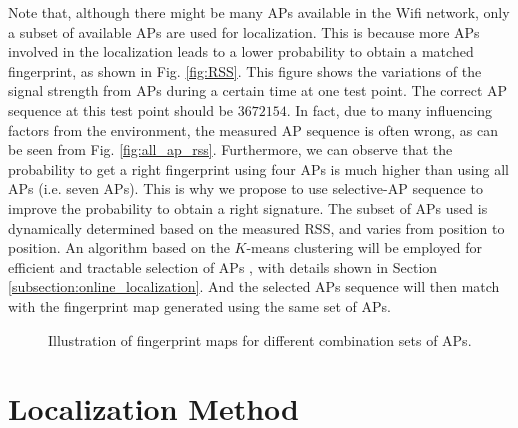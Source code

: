\documentclass[10pt, conference, letterpaper]{IEEEtran}
\begin{document}
Note that, although there might be many APs available in the Wifi network, only a subset of available APs are used for localization. 
This is because more APs involved in the localization leads to a lower probability to obtain a matched fingerprint, as shown in Fig. \ref{fig:RSS}. 
This figure shows the variations of the signal strength from APs during a certain time at one test point. 
The correct AP sequence at this test point should be $3672154$. 
In fact, due to many influencing factors from the environment, the measured AP sequence is often wrong, as can be seen from Fig. \ref{fig:all_ap_rss}.
Furthermore, we can observe that the probability to get a right fingerprint using four APs is much higher than using all APs (i.e. seven APs).
This is why we propose to use selective-AP sequence to improve the probability to obtain a right signature. 
The subset of APs used is dynamically determined based on the measured RSS, and varies from position to position. 
An algorithm based on the $K$-means clustering will be employed for efficient and tractable selection of APs \cite{Kmeans}, 
with details shown in Section \ref{subsection:online_localization}. 
And the selected APs sequence will then match with the fingerprint map generated using the same set of APs. 

\begin{figure*}
  \centering
   \caption[AP fingerprint model.]
{Illustration of fingerprint maps for different combination sets of APs.}
\label{fig:AP_fingerpringting_model}
\vspace{-0.2in}
\end{figure*}

\section{Localization Method}
\label{section:localization_method}
\end{document}
